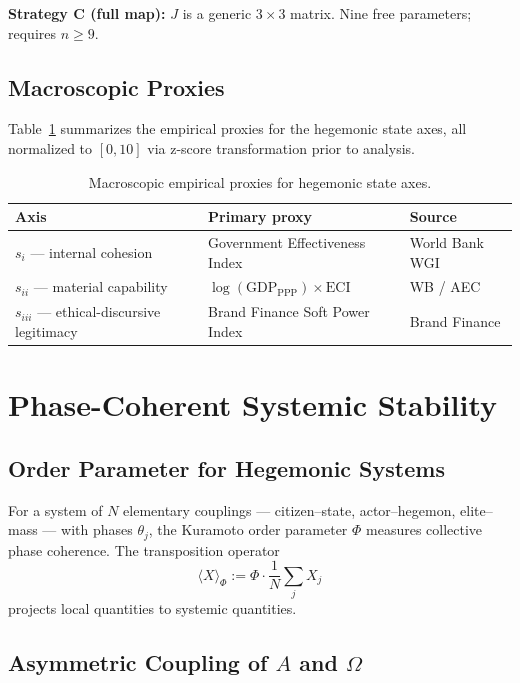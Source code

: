 \documentclass[12pt]{article}
\theoremstyle{plain}
\theoremstyle{definition}
\theoremstyle{remark}
\begin{document}
\textbf{Strategy C (full map):} $J$ is a generic $3\times3$ matrix. Nine free parameters; requires $n \geq 9$.

\subsection{Macroscopic Proxies}

Table~\ref{tab:proxies} summarizes the empirical proxies for the hegemonic state axes, all normalized to $[0,10]$ via z-score transformation prior to analysis.

\begin{table}[h]
\centering
\caption{Macroscopic empirical proxies for hegemonic state axes.}
\label{tab:proxies}
{\small\begin{tabular}{lll}
\toprule
Axis & Primary proxy & Source \\
\midrule
$s_i$ --- internal cohesion & Government Effectiveness Index & World Bank WGI \\
$s_{ii}$ --- material capability & $\log(\text{GDP}_{\text{PPP}}) \times \text{ECI}$ & WB / AEC \\
$s_{iii}$ --- ethical-discursive legitimacy & Brand Finance Soft Power Index & Brand Finance \\
\bottomrule
\end{tabular}}
\end{table}

\section{Phase-Coherent Systemic Stability}
\label{sec:stability}

\subsection{Order Parameter for Hegemonic Systems}

For a system of $N$ elementary couplings --- citizen--state, actor--hegemon, elite--mass --- with phases $\theta_j$, the Kuramoto order parameter $\Phi$ measures collective phase coherence. The transposition operator
\begin{equation}\label{eq:trans-op}
\langle X \rangle_\Phi := \Phi \cdot \frac{1}{N}\sum_j X_j
\end{equation}
projects local quantities to systemic quantities.

\subsection{Asymmetric Coupling of $A$ and $\Omega$}
\end{document}
